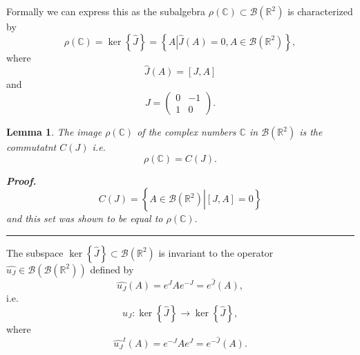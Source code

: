 \documentclass[aps,preprint]{revtex4}
\newtheorem{lemma}[theorem]{Lemma}
\newenvironment{proof}[1][Proof]{\noindent\textbf{#1.} }{\ \rule{0.5em}{0.5em}}
\begin{document}
Formally we can express this as the subalgebra $\rho \left( \mathbb{C}%
\right) \subset \mathcal{B}\left( \mathbb{R}^{2}\right) $ is characterized
by 
\begin{equation}
\rho \left( \mathbb{C}\right) =\ker \left\{ \widehat{J}\right\} =\left\{
\left. \overset{}{A}\right\vert \widehat{J}\left( A\right) =0,A\in \mathcal{B%
}\left( \mathbb{R}^{2}\right) \right\} ,
\end{equation}%
where 
\begin{equation}
\widehat{J}\left( A\right) =\left[ J,A\right]
\end{equation}%
and 
\begin{equation}
J=\left( 
\begin{array}{cc}
0 & -1 \\ 
1 & 0%
\end{array}%
\right) .
\end{equation}

\begin{lemma}
The image $\rho \left( \mathbb{C}\right) $ of the complex numbers $\mathbb{C}
$ in $\mathcal{B}\left( \mathbb{R}^{2}\right) $ is the commutatnt $C\left(
J\right) $ i.e. 
\begin{equation}
\rho \left( \mathbb{C}\right) =C\left( J\right) .
\end{equation}

\begin{proof}
\begin{equation}
C\left( J\right) =\left\{ \left. \overset{}{A\in \mathcal{B}\left( \mathbb{R}%
^{2}\right) }\right\vert \left[ J,A\right] =0\right\}
\end{equation}%
and this set was shown to be equal to $\rho \left( \mathbb{C}\right) .$
\end{proof}
\end{lemma}

The subspace $\ker \left\{ \widehat{J}\right\} \subset \mathcal{B}\left( 
\mathbb{R}^{2}\right) $ is invariant to the operator $\widehat{u_{J}}\in 
\mathcal{B}\left( \mathcal{B}\left( \mathbb{R}^{2}\right) \right) $ defined
by 
\begin{equation}
\widehat{u_{J}}\left( A\right) =e^{J}Ae^{-J}=e^{\widehat{J}}\left( A\right) ,
\end{equation}%
i.e. 
\begin{equation}
\widehat{u_{J}}:\ker \left\{ \widehat{J}\right\} \rightarrow \ker \left\{ 
\widehat{J}\right\} ,
\end{equation}%
where 
\begin{equation}
\widehat{u_{J}}^{t}\left( A\right) =e^{-J}Ae^{J}=e^{-\widehat{J}}\left(
A\right) .
\end{equation}
\end{document}
